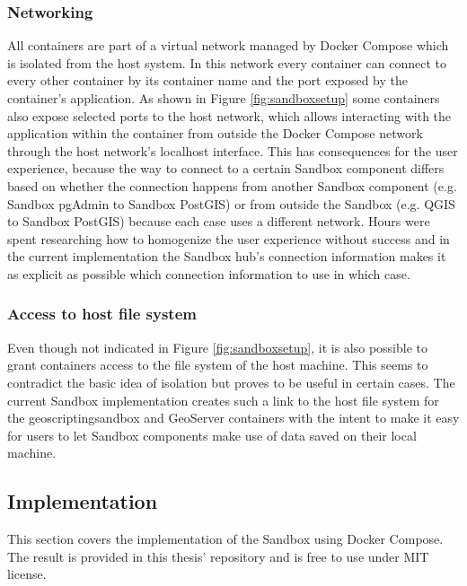 \documentclass[11pt, a4paper, oneside, parskip=full-]{scrartcl}
\begin{document}
\subsubsection*{Networking}
All containers are part of a virtual network managed by Docker Compose which is
isolated from the host system. In this network every container can connect to
every other container by its container name and the port exposed by the
container's application. As shown in Figure \ref{fig:sandboxsetup} some
containers also expose selected ports to the host network, which allows
interacting with the application within the container from outside the Docker
Compose network through the host network's localhost interface. This has
consequences for the user experience, because the way to connect to a certain
Sandbox component differs based on whether the connection happens from another
Sandbox component (e.g. Sandbox pgAdmin to Sandbox PostGIS) or from outside the
Sandbox (e.g. QGIS to Sandbox PostGIS) because each case uses a different
network. Hours were spent researching how to homogenize the user experience
without success and in the current implementation the Sandbox hub's connection
information makes it as explicit as possible which connection information to use
in which case.

\subsubsection*{Access to host file system}
Even though not indicated in Figure \ref{fig:sandboxsetup}, it is also possible
to grant containers access to the file system of the host machine. This seems to
contradict the basic idea of isolation but proves to be useful in certain cases.
The current Sandbox implementation creates such a link to the host file system
for the geoscriptingsandbox and GeoServer containers with the intent to make it
easy for users to let Sandbox components make use of data saved on their local
machine.

\subsection{Implementation}

This section covers the implementation of the Sandbox using Docker Compose. The
result is provided in this thesis' repository\cite{osgeostacksandbox} and is
free to use under MIT license.
\end{document}
